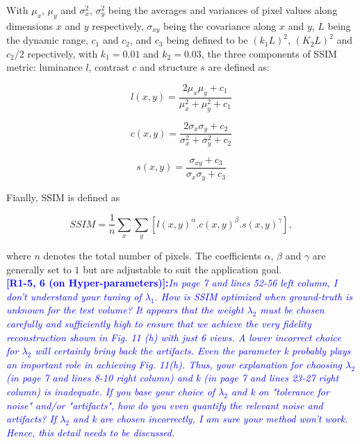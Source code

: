 \documentclass{article}
\begin{document}
With $\mu_x$, $\mu_y$ and $\sigma_x^2$, $\sigma_y^2$ being the averages and variances of pixel values along dimensions $x$ and $y$ respectively, $\sigma_{xy}$ being the covariance along $x$ and $y$, $L$ being the dynamic range, $c_1$ and $c_2$, and $c_3$ being defined to be $(k_1L)^2$, $(K_2L)^2$ and $c_2/2$ repectively, with $k_1=0.01$ and $k_2=0.03$, the three components of SSIM metric: luminance $l$, contrast $c$ and structure $s$ are defined as: 

\begin{equation}
l(x,y) = \frac{2\mu_x\mu_y + c_1}{\mu_x^2 + \mu_y^2 + c_1}
\end{equation}

\begin{equation}
  c(x,y) = \frac{2\sigma_x\sigma_y + c_2}{\sigma_x^2 + \sigma_y^2 + c_2}
\end{equation}

\begin{equation}
  s(x,y) = \frac{\sigma_{xy} + c_3}{\sigma_x\sigma_y + c_3}
\end{equation}

Fianlly, SSIM is defined as

\begin{equation}
  SSIM = \frac{1}{n}\sum_x\sum_y [l(x,y)^\alpha. c(x,y)^\beta. s(x,y)^\gamma],
\end{equation}

where $n$ denotes the total number of pixels. The coefficients $\alpha$, $\beta$ and $\gamma$ are generally set to $1$ but are adjustable to suit the application goal.\\

\textcolor{blue}{\textbf{[R1-5, 6 (on Hyper-parameters)]:}\textit{In page 7 and lines 52-56 left column, I don't understand your tuning of $\lambda_1$. How is SSIM optimized when ground-truth is unknown for the test volume?
    It appears that the weight $\lambda_2$ must be chosen carefully and sufficiently high to ensure that we achieve the very fidelity reconstruction shown in Fig. 11 (h) with just 6 views. A lower incorrect choice for $\lambda_2$ will certainly bring back the artifacts. Even the parameter k probably plays an important role in achieving Fig. 11(h). Thus, your explanation for choosing $\lambda_2$ (in page 7 and lines 8-10 right column) and k (in page 7 and lines 23-27 right column) is inadequate. If you base your choice of $\lambda_2$ and k on "tolerance for noise" and/or "artifacts", how do you even quantify the relevant noise and artifacts? If $\lambda_2$ and k are chosen incorrectly, I am sure your method won't work. Hence, this detail needs to be discussed.}}\\
\end{document}
